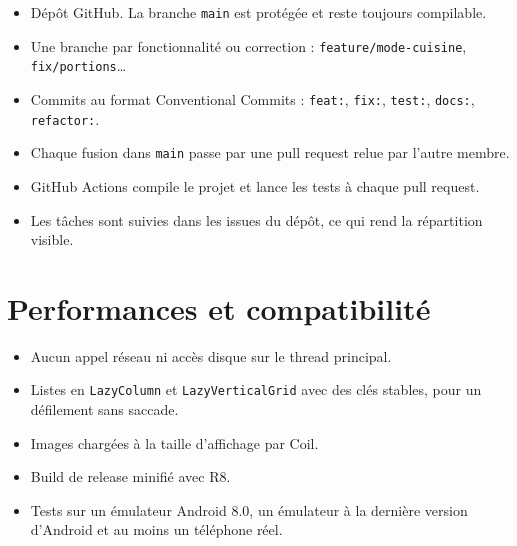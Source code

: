 \begin{itemize}
  \item Dépôt GitHub. La branche \texttt{main} est protégée et reste toujours
        compilable.
  \item Une branche par fonctionnalité ou correction :
        \texttt{feature/mode-cuisine}, \texttt{fix/portions}…
  \item Commits au format Conventional Commits : \texttt{feat:},
        \texttt{fix:}, \texttt{test:}, \texttt{docs:}, \texttt{refactor:}.
  \item Chaque fusion dans \texttt{main} passe par une pull request relue
        par l'autre membre.
  \item GitHub Actions compile le projet et lance les tests à chaque pull
        request.
  \item Les tâches sont suivies dans les issues du dépôt, ce qui rend la
        répartition visible.
\end{itemize}

\section{Performances et compatibilité}

\begin{itemize}
  \item Aucun appel réseau ni accès disque sur le thread principal.
  \item Listes en \texttt{LazyColumn} et \texttt{LazyVerticalGrid} avec des
        clés stables, pour un défilement sans saccade.
  \item Images chargées à la taille d'affichage par Coil.
  \item Build de release minifié avec R8.
  \item Tests sur un émulateur Android 8.0, un émulateur à la dernière
        version d'Android et au moins un téléphone réel.
\end{itemize}
